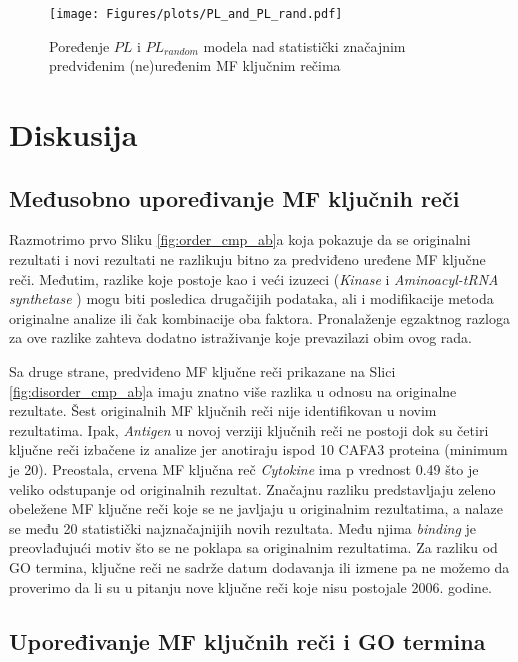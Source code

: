 \begin{figure}[th]
\hspace*{-3.0cm} 
\texttt{[image: Figures/plots/PL\_and\_PL\_rand.pdf]}
\caption {
  Poređenje $PL$ i $PL_{random}$ modela nad statistički značajnim predviđenim (ne)uređenim MF ključnim rečima
}
\label{fig:PLrand}
\end{figure}




\chapter{Diskusija} %

\label{Diskusija} %

\section{Međusobno upoređivanje MF ključnih reči}

Razmotrimo prvo Sliku \ref{fig:order_cmp_ab}a koja pokazuje da se originalni
rezultati i novi rezultati ne razlikuju bitno za predviđeno uređene MF ključne
reči. Međutim, razlike koje postoje kao i veći izuzeci (\textit{Kinase} i
\textit{Aminoacyl-tRNA synthetase} )  mogu biti posledica drugačijih podataka,
ali i modifikacije metoda originalne analize ili čak kombinacije oba faktora.
Pronalaženje egzaktnog razloga za ove razlike zahteva dodatno istraživanje koje
prevazilazi obim ovog rada.

Sa druge strane, predviđeno  MF ključne reči prikazane na
Slici \ref{fig:disorder_cmp_ab}a imaju znatno više razlika u odnosu na
originalne rezultate.  Šest originalnih MF ključnih reči nije identifikovan u
novim rezultatima. Ipak, \textit{Antigen} u novoj verziji ključnih reči ne
postoji dok su četiri ključne reči izbačene iz analize jer anotiraju ispod 10
CAFA3 proteina (minimum je 20).  Preostala, crvena MF ključna reč
\textit{Cytokine} ima p vrednost 0.49 što je veliko odstupanje od originalnih
rezultat. Značajnu razliku predstavljaju zeleno obeležene MF ključne reči koje
se ne javljaju u originalnim rezultatima, a nalaze se među 20 statistički
najznačajnijih novih rezultata. Među njima \textit{binding} je preovlađujući
motiv što se ne poklapa sa originalnim rezultatima. Za razliku od GO termina,
ključne reči ne sadrže datum dodavanja ili izmene pa ne možemo da proverimo da
li su u pitanju nove ključne reči koje nisu postojale 2006. godine.


\section{Upoređivanje MF ključnih reči i GO termina}

